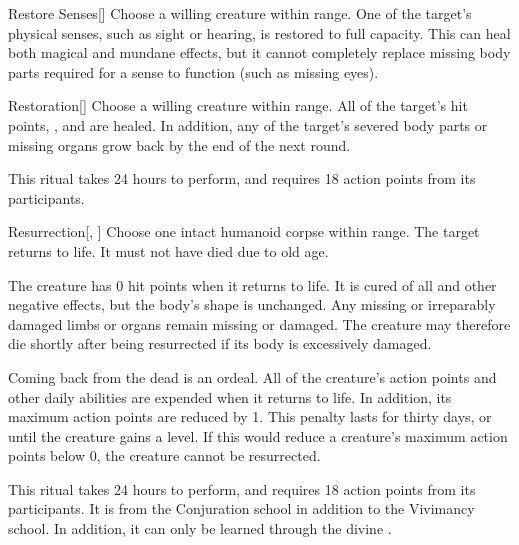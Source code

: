 \lowercase{\hypertarget{spell:Restore Senses}{}}\label{spell:Restore Senses}
\begin{apability}[\nth{2}]{\hypertarget{spell:Restore Senses}{Restore Senses}}[]
Choose a willing creature within \rngmed range.
One of the target's physical senses, such as sight or hearing, is restored to full capacity.
This can heal both magical and mundane effects, but it cannot completely replace missing body parts required for a sense to function (such as missing eyes).
\end{apability}
\vspace{0.25em}



\lowercase{\hypertarget{spell:Restoration}{}}\label{spell:Restoration}
\begin{apability}[\nth{3}]{\hypertarget{spell:Restoration}{Restoration}}[]
Choose a willing creature within \rngclose range.
All of the target's hit points, , and  are healed.
In addition, any of the target's severed body parts or missing organs grow back by the end of the next round.

This ritual takes 24 hours to perform, and requires 18 action points from its participants.
\end{apability}
\vspace{0.25em}



\lowercase{\hypertarget{spell:Resurrection}{}}\label{spell:Resurrection}
\begin{apability}[\nth{3}]{\hypertarget{spell:Resurrection}{Resurrection}}[, ]
Choose one intact humanoid corpse within \rngclose range.
The target returns to life.
It must not have died due to old age.

The creature has 0 hit points when it returns to life.
It is cured of all  and other negative effects, but the body's shape is unchanged.
Any missing or irreparably damaged limbs or organs remain missing or damaged.
The creature may therefore die shortly after being resurrected if its body is excessively damaged.

Coming back from the dead is an ordeal.
All of the creature's action points and other daily abilities are expended when it returns to life.
In addition, its maximum action points are reduced by 1.
This penalty lasts for thirty days, or until the creature gains a level.
If this would reduce a creature's maximum action points below 0, the creature cannot be resurrected.

This ritual takes 24 hours to perform, and requires 18 action points from its participants.
It is from the Conjuration school in addition to the Vivimancy school.
In addition, it can only be learned through the divine .
\end{apability}
\vspace{0.25em}



